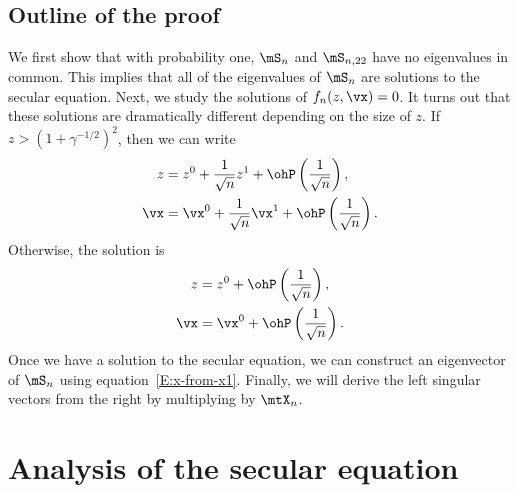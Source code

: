 \subsection{Outline of the proof}

We first show that with probability one, $\mS_n$ and $\mS_{n,22}$ have no eigenvalues in common.  This implies that all of the eigenvalues of $\mS_n$ are solutions to the secular equation.  Next, we study the solutions of 
$f_n(z, \vx) = 0$.  It turns out that these solutions are dramatically different depending on the size of $z$.  If $z > (1 + \gamma^{-1/2})^2$,
then we can write
\begin{align*}
    z 
        &= 
            z^0 
            + 
            \frac{1}{\sqrt{n}}
            z^1 
            + 
            \ohP\left( \frac{1}{\sqrt{n}} \right), \\
    \vx
        &=
            \vx^0
            +
            \frac{1}{\sqrt{n}}
            \vx^1
            + 
            \ohP\left( \frac{1}{\sqrt{n}} \right).
\end{align*}
Otherwise, the solution is
\begin{align*}
    z
        &=
            z^0
            + 
            \ohP\left( \frac{1}{\sqrt{n}} \right), \\
    \vx
        &=
            \vx^0
            +
            \ohP\left( \frac{1}{\sqrt{n}} \right).
\end{align*}
Once we have a solution to the secular equation, we can construct an
eigenvector of $\mS_n$ using equation~\eqref{E:x-from-x1}.  Finally, we will derive the left singular vectors from the right by multiplying by $\mtX_n$.

\section{Analysis of the secular equation}

